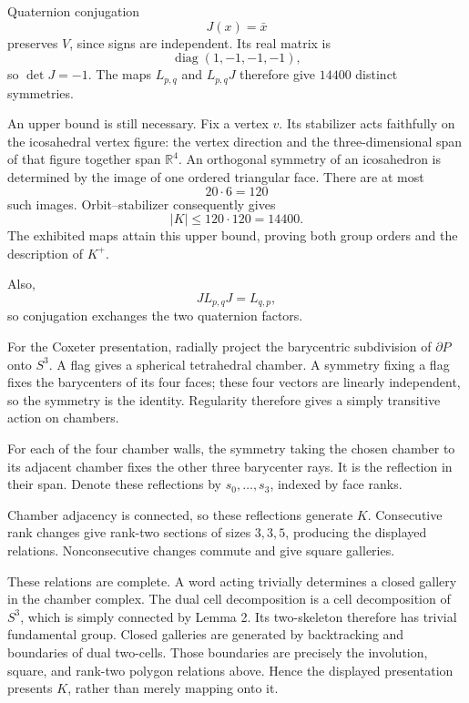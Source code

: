 \documentclass[
  10pt,
  a4paper,
]{article}
\begin{document}
Quaternion conjugation \begin{equation}
J(x)=\bar x
\end{equation} preserves \(V\), since signs are independent. Its real
matrix is \begin{equation}
\operatorname{diag}(1,-1,-1,-1),
\end{equation} so \(\det J=-1\). The maps \(L_{p,q}\) and \(L_{p,q}J\)
therefore give \(14400\) distinct symmetries.

An upper bound is still necessary. Fix a vertex \(v\). Its stabilizer
acts faithfully on the icosahedral vertex figure: the vertex direction
and the three-dimensional span of that figure together span
\(\mathbb R^4\). An orthogonal symmetry of an icosahedron is determined
by the image of one ordered triangular face. There are at most
\begin{equation}
20\cdot6=120
\end{equation} such images. Orbit--stabilizer consequently gives
\begin{equation}
|K|\le120\cdot120=14400.
\end{equation} The exhibited maps attain this upper bound, proving both
group orders and the description of \(K^+\).

Also, \begin{equation}
J L_{p,q}J=L_{q,p},
\end{equation} so conjugation exchanges the two quaternion factors.

For the Coxeter presentation, radially project the barycentric
subdivision of \(\partial P\) onto \(S^3\). A flag gives a spherical
tetrahedral chamber. A symmetry fixing a flag fixes the barycenters of
its four faces; these four vectors are linearly independent, so the
symmetry is the identity. Regularity therefore gives a simply transitive
action on chambers.

For each of the four chamber walls, the symmetry taking the chosen
chamber to its adjacent chamber fixes the other three barycenter rays.
It is the reflection in their span. Denote these reflections by
\(s_0,\ldots,s_3\), indexed by face ranks.

Chamber adjacency is connected, so these reflections generate \(K\).
Consecutive rank changes give rank-two sections of sizes \(3,3,5\),
producing the displayed relations. Nonconsecutive changes commute and
give square galleries.

These relations are complete. A word acting trivially determines a
closed gallery in the chamber complex. The dual cell decomposition is a
cell decomposition of \(S^3\), which is simply connected by Lemma 2. Its
two-skeleton therefore has trivial fundamental group. Closed galleries
are generated by backtracking and boundaries of dual two-cells. Those
boundaries are precisely the involution, square, and rank-two polygon
relations above. Hence the displayed presentation presents \(K\), rather
than merely mapping onto it.
\end{document}
